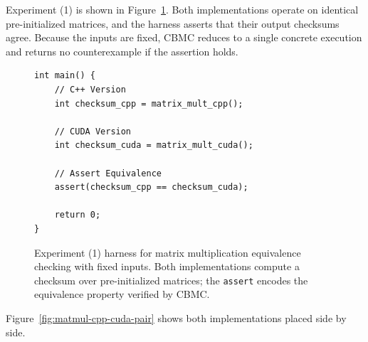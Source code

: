 \documentclass{article}
\begin{document}
Experiment (1) is shown in Figure~\ref{fig:matmul-cbmc-fixed}. Both implementations operate on identical pre-initialized matrices, and the harness asserts that their output checksums agree. Because the inputs are fixed, CBMC reduces to a single concrete execution and returns no counterexample if the assertion holds.

\begin{figure}[H]
\begin{verbatim}
int main() {
    // C++ Version
    int checksum_cpp = matrix_mult_cpp();

    // CUDA Version
    int checksum_cuda = matrix_mult_cuda();

    // Assert Equivalence
    assert(checksum_cpp == checksum_cuda);

    return 0;
}
\end{verbatim}
\caption{Experiment (1) harness for matrix multiplication equivalence checking with fixed inputs. Both implementations compute a checksum over pre-initialized matrices; the \texttt{assert} encodes the equivalence property verified by CBMC.}
\label{fig:matmul-cbmc-fixed}
\end{figure}

Figure~\ref{fig:matmul-cpp-cuda-pair} shows both implementations placed side by side.
\end{document}
